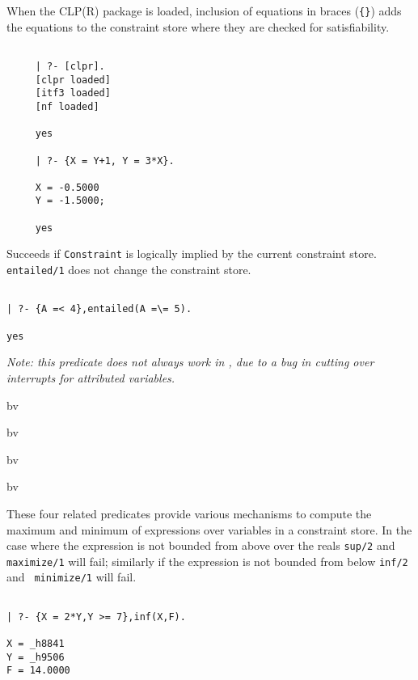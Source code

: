 \begin{description}
 {} 

When the CLP(R) package is loaded, inclusion of equations in braces
({\tt \{\}}) adds the equations to the constraint store where they are
checked for satisfiability.

{\small
\begin{verbatim}

     | ?- [clpr].
     [clpr loaded]
     [itf3 loaded]
     [nf loaded]

     yes

     | ?- {X = Y+1, Y = 3*X}.

     X = -0.5000
     Y = -1.5000;

     yes
\end{verbatim}
}

 {} 

Succeeds if {\tt Constraint} is logically implied by the current
constraint store.  {\tt entailed/1} does not change the constraint
store.

{\small
\begin{verbatim}

| ?- {A =< 4},entailed(A =\= 5).

yes   
\end{verbatim}
}

{\em Note: this predicate does not always work in \version, due to a
bug in cutting over interrupts for attributed variables.}

 {bv} 

 {bv} 

 {bv} 

 {bv} 

These four related predicates provide various mechanisms to compute
the maximum and minimum of expressions over variables in a constraint
store.  In the case where the expression is not bounded from above
over the reals {\tt sup/2} and {\tt maximize/1} will fail; similarly
if the expression is not bounded from below {\tt inf/2} and {\tt
minimize/1} will fail.

{\small
\begin{verbatim}

| ?- {X = 2*Y,Y >= 7},inf(X,F).

X = _h8841
Y = _h9506
F = 14.0000


\end{verbatim}}
\end{description}
